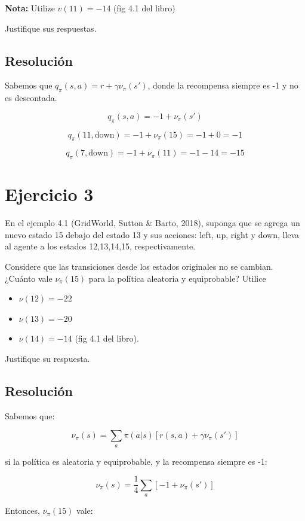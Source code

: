 \documentclass[12pt,a4paper]{article}
\begin{document}
\textbf{Nota:} Utilize $ v(11) = -14$ (fig 4.1 del libro)

Justifique sus respuestas.

\subsection{Resolución}

Sabemos que $q_\pi(s,a) = r + \gamma\nu_\pi(s')$, donde la recompensa siempre es -1
y no es descontada.

$$ q_\pi(s,a) = -1 + \nu_\pi(s') $$

$$ q_\pi(11,\text{down}) = -1 + \nu_\pi(15) = -1 + 0 = -1 $$

$$ q_\pi(7,\text{down}) = -1 + \nu_\pi(11) = -1 - 14 = -15 $$

\section{Ejercicio 3}  %

En el ejemplo 4.1 (GridWorld, Sutton \& Barto, 2018), suponga que se agrega un nuevo estado 15 debajo
del estado 13 y sus acciones: left, up, right y down, lleva al agente a los estados 12,13,14,15, respectivamente.

Considere que las transiciones desde los estados originales no se cambian. ¿Cuánto vale $\nu_\pi(15)$ para la 
política aleatoria y equiprobable? Utilice

\begin{itemize}

\item $\nu(12) = -22$
\item $\nu(13) = -20$
\item $\nu(14) = -14$ (fig 4.1 del libro).
\end{itemize}

Justifique su respuesta.

\subsection{Resolución}

Sabemos que:

$$ \nu_\pi(s) = \sum_a \pi(a|s) [r(s,a) + \gamma \nu_\pi(s')] $$

si la política es aleatoria y equiprobable, y la recompensa siempre es -1:

$$ \nu_\pi(s) = \frac{1}{4} \sum_a [-1 + \nu_\pi(s')] $$

Entonces, $\nu_\pi(15)$ vale:
\end{document}
